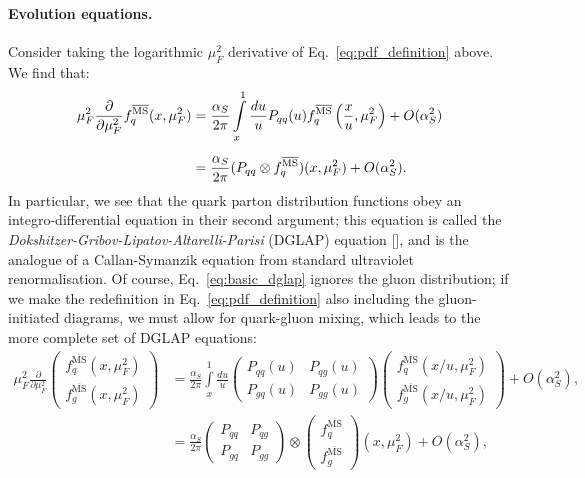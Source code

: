 \documentclass[withindex,glossary]{cam-thesis}
\begin{document}
\paragraph{Evolution equations.} Consider taking the logarithmic $\mu_F^2$ derivative of Eq.~\eqref{eq:pdf_definition} above. We find that:
\begin{align}
\mu_F^2 \frac{\partial}{\partial \mu_F^2} f_q^{\overline{\text{MS}}}(x,\mu_F^2)& = \frac{\alpha_S}{2\pi} \int\limits_{x}^{1} \frac{du}{u} P_{qq}(u) f_q^{\overline{\text{MS}}}\left( \frac{x}{u}, \mu_F^2\right) + O(\alpha_S^2) \notag \\[1.5ex]
\label{eq:basic_dglap}
&= \frac{\alpha_S}{2\pi} (P_{qq} \otimes f_q^{\overline{\text{MS}}})(x, \mu_F^2) + O(\alpha_S^2).
\end{align}
In particular, we see that the quark parton distribution functions obey an integro-differential equation in their second argument; this equation is called the \textit{Dokshitzer-Gribov-Lipatov-Altarelli-Parisi} (DGLAP) equation [], and is the analogue of a Callan-Symanzik equation from standard ultraviolet renormalisation. Of course, Eq.~\eqref{eq:basic_dglap} ignores the gluon distribution; if we make the redefinition in Eq.~\eqref{eq:pdf_definition} also including the gluon-initiated diagrams, we must allow for quark-gluon mixing, which leads to the more complete set of DGLAP equations:
\begin{align}
\mu_F^2 \frac{\partial}{\partial \mu_F^2} \begin{pmatrix} f_q^{\overline{\text{MS}}}(x,\mu_F^2) \\ f_g^{\overline{\text{MS}}}(x,\mu_F^2) \end{pmatrix} &= \frac{\alpha_S}{2\pi} \int\limits_{x}^{1} \frac{du}{u} \begin{pmatrix} P_{qq}(u) & P_{qg}(u) \\ P_{gq}(u) & P_{gg}(u) \end{pmatrix}  \begin{pmatrix} f_q^{\overline{\text{MS}}}\left( x/u, \mu_F^2\right) \\ f_g^{\overline{\text{MS}}}\left(x/u, \mu_F^2\right) \end{pmatrix} + O(\alpha_S^2),\\[1.5ex]
\label{eq:qcd_dglap}
&= \frac{\alpha_S}{2\pi} \begin{pmatrix} P_{qq} & P_{qg} \\ P_{gq} & P_{gg} \end{pmatrix}  \otimes \begin{pmatrix} f_q^{\overline{\text{MS}}} \\ f_g^{\overline{\text{MS}}} \end{pmatrix} \left(x , \mu_F^2\right) + O(\alpha_S^2),
\end{align}
\end{document}
